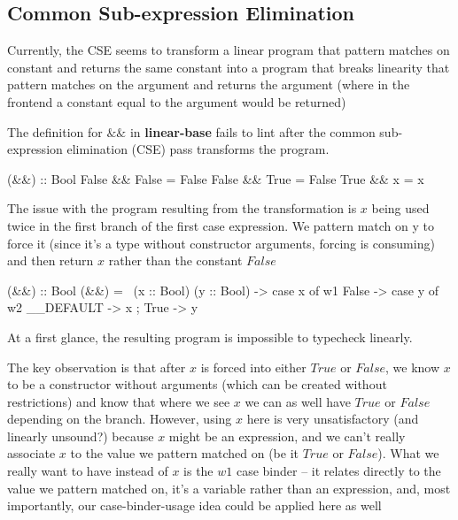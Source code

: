 \documentclass[]{lwnovathesis}
\begin{document}
\subsection{Common Sub-expression Elimination}

Currently, the CSE seems to transform a linear program that pattern matches on
constant and returns the same constant into a program that breaks linearity that
pattern matches on the argument and returns the argument (where in the frontend
a constant equal to the argument would be returned)

The definition for $\&\&$ in \textbf{linear-base} fails to lint after the common
sub-expression elimination (CSE) pass transforms the program.
\begin{code}
(&&) :: Bool %
False && False = False
False && True = False
True && x = x
\end{code}
The issue with the program resulting from the transformation is $x$ being used
twice in the first branch of the first case expression. We pattern match on y to
force it (since it's a type without constructor arguments, forcing is consuming)
and then return $x$ rather than the constant $False$
\begin{code}
(&&) :: Bool %
(&&) = \ (x :: Bool) (y :: Bool) ->
  case x of w1 {
    False -> case y of w2 { __DEFAULT -> x };
    True -> y
  }
\end{code}
At a first glance, the resulting program is impossible to typecheck linearly.

The key observation is that after $x$ is forced into either $True$ or $False$,
we know $x$ to be a constructor without arguments (which can be created
without restrictions) and know that where we see $x$ we can as well have
$True$ or $False$ depending on the branch. However, using $x$ here is very
unsatisfactory (and linearly unsound?) because $x$ might be an expression, and
we can't really associate $x$ to the value we pattern matched on (be it $True$
or $False$). What we really want to have instead of $x$ is the $w1$ case binder --
it relates directly to the value we pattern matched on, it's a variable rather
than an expression, and, most importantly, our case-binder-usage idea could be
applied here as well

\end{document}
